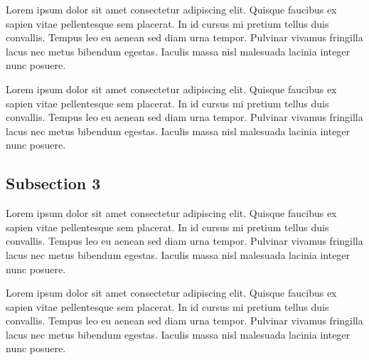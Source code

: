 \documentclass[sigconf,nonacm]{acmart} %
\begin{document}
Lorem ipsum dolor sit amet consectetur adipiscing elit.
Quisque faucibus ex sapien vitae pellentesque sem placerat. 
In id cursus mi pretium tellus duis convallis.
Tempus leo eu aenean sed diam urna tempor. 
Pulvinar vivamus fringilla lacus nec metus bibendum egestas.
Iaculis massa nisl malesuada lacinia integer nunc posuere. 

Lorem ipsum dolor sit amet consectetur adipiscing elit. 
Quisque faucibus ex sapien vitae pellentesque sem placerat.
In id cursus mi pretium tellus duis convallis. 
Tempus leo eu aenean sed diam urna tempor.
Pulvinar vivamus fringilla lacus nec metus bibendum egestas. 
Iaculis massa nisl malesuada lacinia integer nunc posuere.

\subsection{Subsection 3}
\label{subsec:subsection-3}

Lorem ipsum dolor sit amet consectetur adipiscing elit. 
Quisque faucibus ex sapien vitae pellentesque sem placerat.
In id cursus mi pretium tellus duis convallis. 
Tempus leo eu aenean sed diam urna tempor.
Pulvinar vivamus fringilla lacus nec metus bibendum egestas. 
Iaculis massa nisl malesuada lacinia integer nunc posuere.

Lorem ipsum dolor sit amet consectetur adipiscing elit. 
Quisque faucibus ex sapien vitae pellentesque sem placerat.
In id cursus mi pretium tellus duis convallis. 
Tempus leo eu aenean sed diam urna tempor.
Pulvinar vivamus fringilla lacus nec metus bibendum egestas. 
Iaculis massa nisl malesuada lacinia integer nunc posuere.
\end{document}
